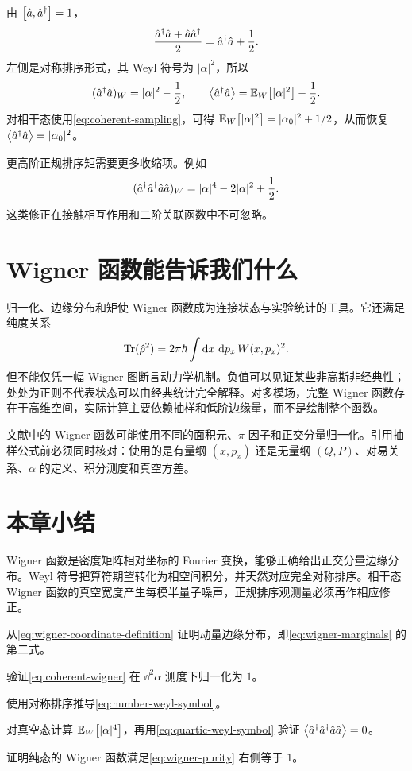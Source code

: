 由 $\left[\hat a,\hat a^{\dagger}\right]=1$，
\begin{equation}
  \frac{\hat a^{\dagger}\hat a+\hat a\hat a^{\dagger}}{2}=\hat a^{\dagger}\hat a+\frac12.
\end{equation}
左侧是对称排序形式，其 Weyl 符号为 $|\alpha|^2$，所以
\begin{equation}
  (\hat a^{\dagger}\hat a)_W=|\alpha|^2-\frac12,
  \qquad
  \left\langle \hat a^{\dagger}\hat a\right\rangle=\mathbb{E}_{W}\!\left[|\alpha|^2\right]-\frac12.
  \label{eq:number-weyl-symbol}
\end{equation}
对相干态使用\cref{eq:coherent-sampling}，可得 $\mathbb{E}_{W}\!\left[|\alpha|^2\right]=|\alpha_0|^2+1/2$，从而恢复 $\left\langle \hat a^{\dagger}\hat a\right\rangle=|\alpha_0|^2$。

更高阶正规排序矩需要更多收缩项。例如
\begin{equation}
  (\hat a^{\dagger}\hat a^{\dagger}\hat a\hat a)_W
  =|\alpha|^4-2|\alpha|^2+\frac12.
  \label{eq:quartic-weyl-symbol}
\end{equation}
这类修正在接触相互作用和二阶关联函数中不可忽略。

\section{Wigner 函数能告诉我们什么}

归一化、边缘分布和矩使 Wigner 函数成为连接状态与实验统计的工具。它还满足纯度关系
\begin{equation}
  \operatorname{Tr}(\hat\rho^2)=2\pi\hbar\int\mathop{}\!\mathrm{d} x\,\mathop{}\!\mathrm{d} p_x\,W(x,p_x)^2.
  \label{eq:wigner-purity}
\end{equation}
但不能仅凭一幅 Wigner 图断言动力学机制。负值可以见证某些非高斯非经典性；处处为正则不代表状态可以由经典统计完全解释。对多模场，完整 Wigner 函数存在于高维空间，实际计算主要依赖抽样和低阶边缘量，而不是绘制整个函数。

\begin{warningbox}
文献中的 Wigner 函数可能使用不同的面积元、$\pi$ 因子和正交分量归一化。引用抽样公式前必须同时核对：使用的是有量纲 $(x,p_x)$ 还是无量纲 $(Q,P)$、对易关系、$\alpha$ 的定义、积分测度和真空方差。
\end{warningbox}

\section*{本章小结}

Wigner 函数是密度矩阵相对坐标的 Fourier 变换，能够正确给出正交分量边缘分布。Weyl 符号把算符期望转化为相空间积分，并天然对应完全对称排序。相干态 Wigner 函数的真空宽度产生每模半量子噪声，正规排序观测量必须再作相应修正。

\begin{exercises}
  \item 从\cref{eq:wigner-coordinate-definition} 证明动量边缘分布，即\cref{eq:wigner-marginals} 的第二式。
  \item 验证\cref{eq:coherent-wigner} 在 $\dd^2\alpha$ 测度下归一化为 $1$。
  \item 使用对称排序推导\cref{eq:number-weyl-symbol}。
  \item 对真空态计算 $\mathbb{E}_{W}\!\left[|\alpha|^4\right]$，再用\cref{eq:quartic-weyl-symbol} 验证 $\left\langle \hat a^{\dagger}\hat a^{\dagger}\hat a\hat a\right\rangle=0$。
  \item 证明纯态的 Wigner 函数满足\cref{eq:wigner-purity} 右侧等于 $1$。
\end{exercises}
